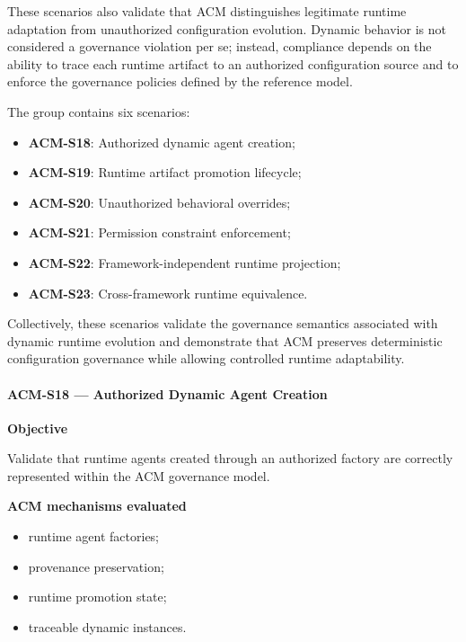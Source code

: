 \documentclass[10pt]{article}
\begin{document}
These scenarios also validate that ACM distinguishes legitimate runtime
adaptation from unauthorized configuration evolution. Dynamic behavior is not
considered a governance violation per se; instead, compliance depends on the
ability to trace each runtime artifact to an authorized configuration source
and to enforce the governance policies defined by the reference model.

The group contains six scenarios:

\begin{itemize}
    \item \textbf{ACM-S18}: Authorized dynamic agent creation;
    \item \textbf{ACM-S19}: Runtime artifact promotion lifecycle;
    \item \textbf{ACM-S20}: Unauthorized behavioral overrides;
    \item \textbf{ACM-S21}: Permission constraint enforcement;
    \item \textbf{ACM-S22}: Framework-independent runtime projection;
    \item \textbf{ACM-S23}: Cross-framework runtime equivalence.
\end{itemize}

Collectively, these scenarios validate the governance semantics associated with
dynamic runtime evolution and demonstrate that ACM preserves deterministic
configuration governance while allowing controlled runtime adaptability.

\paragraph{ACM-S18 --- Authorized Dynamic Agent Creation}

\textbf{Objective}

Validate that runtime agents created through an authorized factory are
correctly represented within the ACM governance model.

\textbf{ACM mechanisms evaluated}

\begin{itemize}
    \item runtime agent factories;
    \item provenance preservation;
    \item runtime promotion state;
    \item traceable dynamic instances.
\end{itemize}
\end{document}
